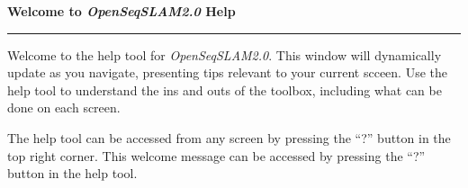 \bigskip
\centerline{\textbf{Welcome to \textit{OpenSeqSLAM2.0} Help}}
\noindent\rule{\textwidth}{2pt}
\bigskip
\parbox{\textwidth}{Welcome to the help tool for \textit{OpenSeqSLAM2.0}. This window will dynamically update as you navigate, presenting tips relevant to your current scceen. Use the help tool to understand the ins and outs of the toolbox, including what can be done on each screen.}
\bigskip
\parbox{\textwidth}{The help tool can be accessed from any screen by pressing the ``?'' button in the top right corner. This welcome message can be accessed by pressing the ``?'' button in the help tool.}
